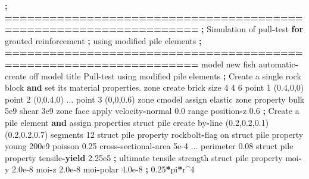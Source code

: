 \documentclass[a4paper, nobind]{templates/ociamthesis}
\newenvironment{Shaded}{\begin{snugshade}}{\end{snugshade}}
\newcommand{\BuiltInTok}[1]{#1}
\newcommand{\ControlFlowTok}[1]{\textcolor[rgb]{0.13,0.29,0.53}{\textbf{#1}}}
\newcommand{\DecValTok}[1]{\textcolor[rgb]{0.00,0.00,0.81}{#1}}
\newcommand{\FloatTok}[1]{\textcolor[rgb]{0.00,0.00,0.81}{#1}}
\newcommand{\KeywordTok}[1]{\textcolor[rgb]{0.13,0.29,0.53}{\textbf{#1}}}
\newcommand{\NormalTok}[1]{#1}
\newcommand{\OperatorTok}[1]{\textcolor[rgb]{0.81,0.36,0.00}{\textbf{#1}}}
\newcommand{\StringTok}[1]{\textcolor[rgb]{0.31,0.60,0.02}{#1}}
\renewenvironment{Shaded}
{
  \vspace{10pt}%
  \begin{snugshade}%
}{%
  \end{snugshade}%
  \vspace{8pt}%
}
\begin{document}
\begin{Shaded}
\begin{Highlighting}[]
    \OperatorTok{;} \OperatorTok{==================================================================}
    \OperatorTok{;}\NormalTok{   Simulation of pull}\OperatorTok{{-}}\NormalTok{test }\ControlFlowTok{for}\NormalTok{ grouted reinforcement}
    \OperatorTok{;}\NormalTok{   using modified pile elements}
    \OperatorTok{;} \OperatorTok{==================================================================}
\NormalTok{    model new }
\NormalTok{    fish automatic}\OperatorTok{{-}}\NormalTok{create off}
\NormalTok{    model title }\StringTok{\textquotesingle{}Pull{-}test using modified pile elements\textquotesingle{}}
    \OperatorTok{;}\NormalTok{ Create a single rock block }\KeywordTok{and} \BuiltInTok{set}\NormalTok{ its material properties.}
\NormalTok{    zone create brick size }\DecValTok{4} \DecValTok{4} \DecValTok{6}\NormalTok{ point }\DecValTok{1}\NormalTok{ (}\FloatTok{0.4}\NormalTok{,}\DecValTok{0}\NormalTok{,}\DecValTok{0}\NormalTok{) point }\DecValTok{2}\NormalTok{ (}\DecValTok{0}\NormalTok{,}\FloatTok{0.4}\NormalTok{,}\DecValTok{0}\NormalTok{) ...}
\NormalTok{                                 point }\DecValTok{3}\NormalTok{ (}\DecValTok{0}\NormalTok{,}\DecValTok{0}\NormalTok{,}\FloatTok{0.6}\NormalTok{)}
\NormalTok{    zone cmodel assign elastic}
\NormalTok{    zone }\BuiltInTok{property}\NormalTok{ bulk }\FloatTok{5e9}\NormalTok{ shear }\FloatTok{3e9}
\NormalTok{    zone face }\BuiltInTok{apply}\NormalTok{ velocity}\OperatorTok{{-}}\NormalTok{normal }\FloatTok{0.0} \BuiltInTok{range}\NormalTok{ position}\OperatorTok{{-}}\NormalTok{z }\FloatTok{0.6}
    \OperatorTok{;}\NormalTok{ Create a pile element }\KeywordTok{and}\NormalTok{ assign properties}
\NormalTok{    struct pile create by}\OperatorTok{{-}}\NormalTok{line (}\FloatTok{0.2}\NormalTok{,}\FloatTok{0.2}\NormalTok{,}\FloatTok{0.1}\NormalTok{) (}\FloatTok{0.2}\NormalTok{,}\FloatTok{0.2}\NormalTok{,}\FloatTok{0.7}\NormalTok{) segments }\DecValTok{12}
\NormalTok{    struct pile }\BuiltInTok{property}\NormalTok{ rockbolt}\OperatorTok{{-}}\NormalTok{flag on}
\NormalTok{    struct pile }\BuiltInTok{property}\NormalTok{ young }\FloatTok{200e9}\NormalTok{ poisson }\FloatTok{0.25}\NormalTok{ cross}\OperatorTok{{-}}\NormalTok{sectional}\OperatorTok{{-}}\NormalTok{area }\FloatTok{5e{-}4}\NormalTok{ ...}
\NormalTok{                         perimeter }\FloatTok{0.08}
\NormalTok{    struct pile }\BuiltInTok{property}\NormalTok{ tensile}\OperatorTok{{-}}\ControlFlowTok{yield} \FloatTok{2.25e5}  \OperatorTok{;}\NormalTok{ ultimate tensile strength}
\NormalTok{    struct pile }\BuiltInTok{property}\NormalTok{ moi}\OperatorTok{{-}}\NormalTok{y }\FloatTok{2.0e{-}8}\NormalTok{ moi}\OperatorTok{{-}}\NormalTok{z }\FloatTok{2.0e{-}8}\NormalTok{ moi}\OperatorTok{{-}}\NormalTok{polar }\FloatTok{4.0e{-}8} \OperatorTok{;} \FloatTok{0.25}\OperatorTok{*}\NormalTok{pi}\OperatorTok{*}\NormalTok{r}\OperatorTok{\^{}}\DecValTok{4}

\end{Highlighting}
\end{Shaded}
\end{document}
